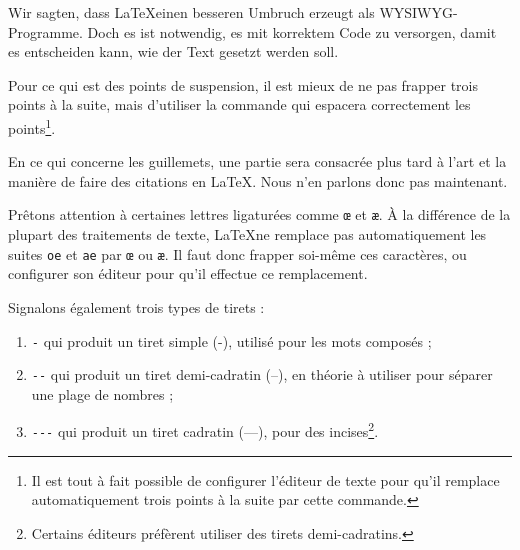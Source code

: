 Wir sagten, dass \LaTeX einen besseren Umbruch erzeugt als WYSIWYG-Programme. Doch es ist  notwendig, es mit korrektem Code zu versorgen, damit es entscheiden kann, wie der Text gesetzt werden soll.



Pour ce qui est des points de suspension, il est mieux de ne pas frapper trois points à la suite, mais d'utiliser la commande  qui espacera correctement les points\footnote{Il est tout à fait possible de configurer l'éditeur de texte pour qu'il remplace automatiquement trois points à la suite par cette commande.}.

En ce qui concerne les guillemets, une partie sera consacrée plus tard à l'art et la manière de faire des citations en \LaTeX. Nous n'en parlons donc pas maintenant.

Prêtons attention à certaines lettres ligaturées comme  \verb|œ| et  \verb|æ|. À la différence de la plupart des traitements de texte, \LaTeX ne remplace pas automatiquement les suites \verb|oe| et \verb|ae| par \verb|œ| ou \verb|æ|. Il faut donc frapper soi-même ces caractères, ou configurer son éditeur pour qu'il effectue ce remplacement.

Signalons également trois types de tirets\label{tirets} :
\begin{enumerate}
\item \verb|-| qui produit un tiret simple (-), utilisé pour les mots composés ;
\item \verb|--| qui produit un tiret demi-cadratin (--), en théorie à utiliser pour séparer une plage de nombres ;
\item \verb|---| qui produit un tiret cadratin (---), pour des incises\footnote{Certains éditeurs préfèrent utiliser des tirets demi-cadratins.}.
\end{enumerate}
 
